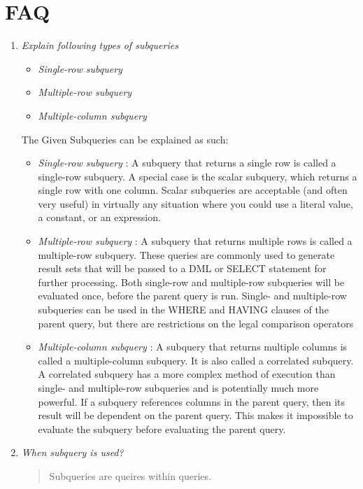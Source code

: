 \documentclass[11pt]{article}
\begin{document}
\section{FAQ}
\begin{enumerate}

\item \textit{Explain following types of subqueries}
\begin{itemize}
    \item \textit{Single-row subquery}    
    \item \textit{Multiple-row subquery}
    \item \textit{Multiple-column subquery}
\end{itemize}

The Given Subqueries can be explained as such: 
\begin{itemize}
    \item \textit{Single-row subquery} : A subquery that returns a single row is called a single-row subquery. A special case is the scalar subquery, which returns a single row with one column. Scalar subqueries are acceptable (and often very useful) in virtually any situation where you could use a literal value, a constant, or an expression.
    \item \textit{Multiple-row subquery} : A subquery that returns multiple rows is called a multiple-row subquery. These queries are commonly used to generate result sets that will be passed to a DML or SELECT statement for further processing. Both single-row and multiple-row subqueries will be evaluated once, before the parent query is run. Single- and multiple-row subqueries can be used in the WHERE and HAVING clauses of the parent query, but there are restrictions on the legal comparison operators
    \item \textit{Multiple-column subquery} : A subquery that returns multiple columns is called a multiple-column subquery. It is also called a correlated subquery.    
    A correlated subquery has a more complex method of execution than single- and multiple-row subqueries and is potentially much more powerful. If a subquery references columns in the parent query, then its result will be dependent on the parent query. This makes it impossible to evaluate the subquery before evaluating the parent query.
\end{itemize}

\item \textit{When subquery is used?}

\begin{quotation}
Subqueries are queires within queries. 
\end{quotation}


\end{enumerate}
\end{document}
